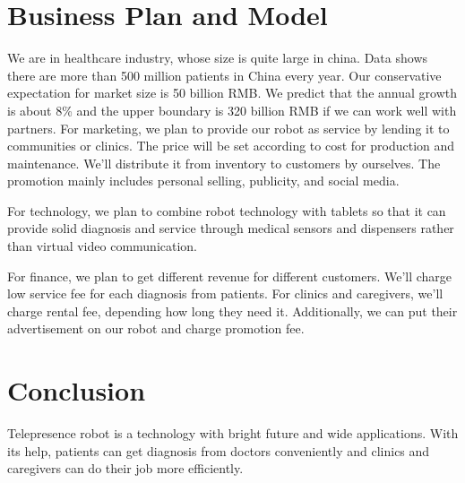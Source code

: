 \documentclass[10pt]{article}
\begin{document}
\section{Business Plan and Model}
We are in healthcare industry, whose size is quite large in china. Data shows there are more than 500 million patients in China every year. Our conservative expectation for market size is 50 billion RMB. We predict that the annual growth is about 8\% and the upper boundary is 320 billion RMB if we can work well with partners. For marketing, we plan to provide our robot as service by lending it to communities or clinics. The price will be set according to cost for production and maintenance. We'll distribute it from inventory to customers by ourselves. The promotion mainly includes personal selling, publicity, and social media.
\par For technology, we plan to combine robot technology with tablets so that it can provide solid diagnosis  and service through medical sensors and dispensers rather than virtual video communication.
\par For finance, we plan to get different revenue for different customers. We'll charge low service fee for each diagnosis from patients. For clinics and caregivers, we'll charge rental fee, depending how long they need it. Additionally, we can put their advertisement on our robot and charge promotion fee.
\section{Conclusion}
Telepresence robot is a technology with bright future and wide applications. With its help, patients can get diagnosis from doctors conveniently and clinics and caregivers can do their job more efficiently.
\end{document}
